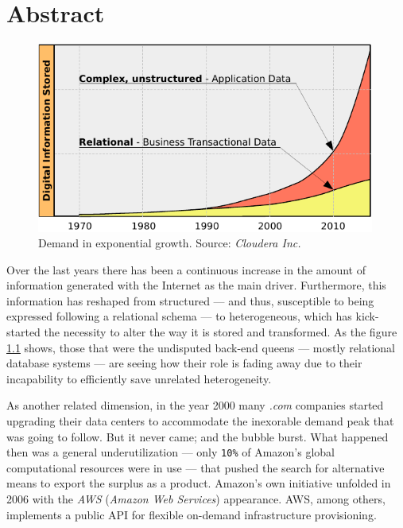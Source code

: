 \chapter{Abstract}\label{cap:intro}


\begin{figure}[tbp]
\begin{center}
\includegraphics[width=0.99\textwidth]{imagenes/001.pdf}
 \caption{Demand in exponential growth. Source: \emph{Cloudera Inc.}}
\label{fig:datagraph}
\end{center}
\end{figure}


\noindent Over the last years there has been a continuous increase in the amount of information generated with the Internet as the main driver. Furthermore, this information has reshaped from structured --- and thus, susceptible to being expressed following a relational schema --- to heterogeneous, which has kick-started the necessity to alter the way it is stored and transformed. As the figure \ref{fig:datagraph} shows, those that were the undisputed back-end queens --- mostly relational database systems --- are seeing how their role is fading away due to their incapability to efficiently save unrelated heterogeneity.

As another related dimension, in the year 2000 many \emph{.com} companies started upgrading their data centers to accommodate the inexorable demand peak that was going to follow. But it never came; and the bubble burst. What happened then was a general underutilization --- only \texttt{10\%} of Amazon's global computational resources were in use --- that pushed the search for alternative means to export the surplus as a product. Amazon's own initiative unfolded in 2006 with the \emph{AWS} (\emph{Amazon Web Services}) appearance. AWS, among others, implements a public API for flexible on-demand infrastructure provisioning.

